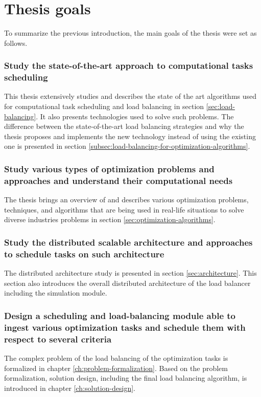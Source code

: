 \section{Thesis goals}\label{sec:thesis-goals}
To summarize the previous introduction,
the main goals of the thesis were set as follows.

\subsubsection{Study the state-of-the-art approach to computational tasks scheduling}
This thesis extensively studies and describes the state of the art algorithms used for computational task scheduling
and load balancing in section \ref{sec:load-balancing}. 
It also presents technologies used to solve such problems.
The difference between the state-of-the-art load balancing strategies
and why the thesis proposes and implements the new technology instead of using the existing one
is presented in section \ref{subsec:load-balancing-for-optimization-algorithms}.

\subsubsection{Study various types of optimization problems and approaches and understand their computational needs}
The thesis brings an overview of and describes various optimization problems, techniques, and algorithms 
that are being used in real-life situations to solve diverse industries problems 
in section \ref{sec:optimization-algorithms}.

\subsubsection{Study the distributed scalable architecture and approaches to schedule tasks on such architecture}

The distributed architecture study is presented in section \ref{sec:architecture}.
This section also introduces the overall distributed architecture of the load balancer
including the simulation module.

\subsubsection{Design a scheduling and load-balancing module able to ingest various optimization tasks and schedule them with respect to several criteria}
The complex problem of the load balancing of the optimization tasks is formalized in chapter \ref{ch:problem-formalization}.
Based on the problem formalization,
solution design, including the final load balancing algorithm, is introduced in chapter \ref{ch:solution-design}.

